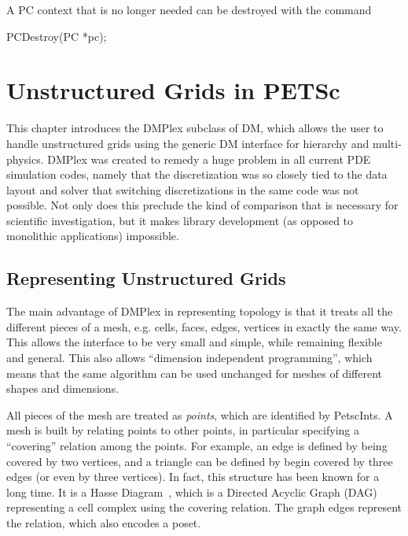 {{A PC context that is no longer needed can be destroyed with the
command
\begin{tabbing}
  PCDestroy(PC *pc);
\end{tabbing}


\cleardoublepage
\chapter{Unstructured Grids in PETSc}
\label{ch_unstructured}

This chapter introduces the DMPlex subclass of DM, which allows the user to handle unstructured grids using the generic
DM interface for hierarchy and multi-physics. DMPlex was created to remedy a huge problem in all current PDE
simulation codes, namely that the discretization was so closely tied to the data layout and solver that switching
discretizations in the same code was not possible. Not only does this preclude the kind of comparison that is necessary
for scientific investigation, but it makes library development (as opposed to monolithic applications) impossible.

\medskip \medskip

\section{Representing Unstructured Grids} 

The main advantage of DMPlex in representing topology is that it treats all the different pieces of a mesh,
e.g. cells, faces, edges, vertices in exactly the same way. This allows the interface to be very small and simple, while
remaining flexible and general. This also allows ``dimension independent programming'', which means that the same
algorithm can be used unchanged for meshes of different shapes and dimensions.

All pieces of the mesh are treated as \textit{points}, which are identified by PetscInts. A mesh is built by relating
points to other points, in particular specifying a ``covering'' relation among the points. For example, an edge is
defined by being covered by two vertices, and a triangle can be defined by begin covered by three edges (or even by
three vertices). In fact, this structure has been known for a long time. It is a Hasse Diagram~\cite{HasseDiagram},
which is a Directed Acyclic Graph (DAG) representing a cell complex using the covering relation. The graph edges
represent the relation, which also encodes a poset.

}}
